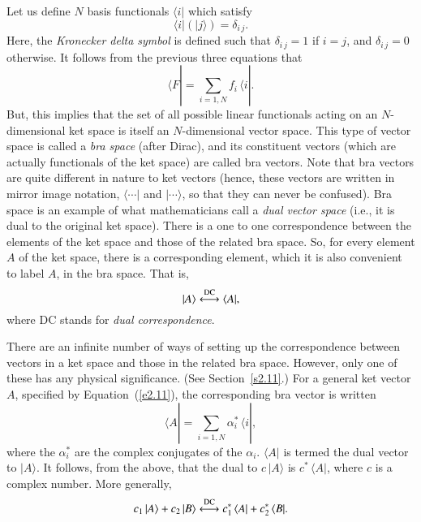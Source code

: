 Let us  define $N$ basis functionals $\langle i|$ which satisfy
\begin{equation}\label{e2.13}
\langle i|(|j\rangle) = \delta_{i\,j}.
\end{equation}
Here, the {\em Kronecker delta symbol}\/ is defined such that $\delta_{i\,j}=1$ if $i=j$, and $\delta_{i\,j}=0$ otherwise.  
It follows from the previous three equations that
\begin{equation}
\langle F| = \sum_{i=1,N} f_i \,\langle i|.
\end{equation}
But, this implies that the set  of all possible linear functionals acting
on an $N$-dimensional ket space is itself an $N$-dimensional vector space.
This type of vector
 space is called a {\em bra
space}\/ (after Dirac), and its constituent vectors 
(which are actually functionals of the ket space) are called bra vectors.
Note that bra vectors are
quite different in nature to  ket vectors (hence, these
vectors are written in mirror image notation,
$\langle\cdots|$ and $|\cdots \rangle$, so that they can never be confused). 
Bra space is an example of what  mathematicians call a {\em dual
vector space}\/ ({\rm i.e.}, it is dual to the original ket space). There is
a one to one correspondence between the elements of the ket space and those
of the related bra space. So, for every element $A$ of the
ket space, there is a corresponding element, which it is also convenient to
label $A$, in the bra space. That is,
\begin{equation}
|A \rangle \stackrel{\rm DC}{\longleftrightarrow}\langle A|,
\end{equation} 
where DC stands for {\em dual correspondence}.

There are an infinite number of ways of setting up the correspondence between
vectors in a ket space and those in the related bra space. However,
only one of these has any physical significance. (See Section~\ref{s2.11}.)  For a general ket vector
$A$, specified by Equation~(\ref{e2.11}), the corresponding bra vector is written
\begin{equation}\label{e2.16}
\langle A| = \sum_{i=1,N}\alpha_i^\ast\, \langle i|,
\end{equation}
where the $\alpha_i^\ast$ are the complex conjugates of the $\alpha_i$.
$\langle A|$ is termed the dual vector to $|A\rangle$. It follows, from the
above, that the dual to $c\, | A\rangle$ is $c^\ast\, \langle A|$, where $c$ is
a complex number. More generally,
\begin{equation}
c_1 \,|A\rangle + c_2 \,|B\rangle \stackrel{\rm DC}{\longleftrightarrow}
c_1^\ast \,\langle A| + c_2^\ast\, \langle B|.
\end{equation}

